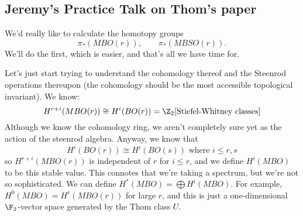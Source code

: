 \documentclass[11pt]{article}
\newcommand{\KanSemResponse}[1]
{
\thispagestyle{fancy}
\subsection*{#1}
}
\begin{document}
\begin{JeremyThomPracticeTalk}
\KanSemResponse
{Jeremy's Practice Talk on Thom's paper}
\renewcommand{\Steen}{\scrA_2}
We'd really like to calculate the homotopy groups
\[\pi_*({MBO}(r)),\qquad \pi_*({MBSO}(r)).\]
We'll do the first, which is easier, and that's all we have time for.

Let's just start trying to understand the cohomology thereof and the Steenrod operations thereupon (the cohomology should be the most accessible topological invariant). We know: 
\[H^{r+i}(MBO(r))\cong H^i(BO(r))=\Z_2[\text{Stiefel-Whitney classes}]\]
Although we know the cohomology ring, we aren't completely sure yet as the action of the steenrod algebra. Anyway, we know that
\[H^i(BO(r))\cong H^i(BO(s))\text{ where $i\leq r,s$}\]
so $H^{r+i}(MBO(r))$ is independent of $r$ for $i\leq r$, and we define $H^i(MBO)$ to be this stable value. This connotes that we're taking a spectrum, but we're not so sophisticated. We can define $H^*(MBO)=\bigoplus H^i(MBO)$. For example, $H^0(MBO)=H^r(MBO(r))$ for large $r$, and this is just a one-dimensional $\F_2$-vector space generated by the Thom class $U$.


\end{JeremyThomPracticeTalk}
\end{document}
